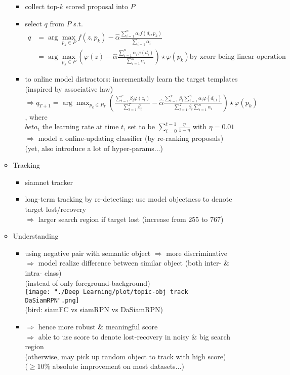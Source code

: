 \begin{itemize}
\begin{itemize}
\begin{itemize}
		\item collect top-$k$ scored proposal into $P$
		\item select $q$ from $P$ s.t. \begin{align*} \displaystyle q &= \arg\max_{p_k\in P} f(z,p_k)-\hat \alpha \frac{\sum_{i=1}^n\alpha_i f(d_i,p_k)}{\sum_{i=1}^n \alpha_i} \\ &= \arg\max_{p_k\in P} (\varphi(z) - \hat\alpha \frac{\sum_{i=1}^n\alpha_i \varphi(d_i)}{\sum_{i=1}^n\alpha_i}) \star \varphi(p_k) \text{by xcorr being linear operation} \end{align*}
		\item to online model distractors: incrementally learn the target templates \\ (inspired by associative law) \\
		$\Rightarrow \displaystyle q_{T+1} = \arg\max_{p_k\in P_T} (\frac{\sum_{t=1}^T\beta_t\varphi(z_t)}{\sum_{t=1}^T\beta_t} - \hat\alpha \frac{\sum_{t=1}^T\beta_t \sum_{i=1}^n\alpha_i \varphi(d_{i,t})}{\sum_{t=1}^T\beta_t\sum_{i=1}^n\alpha_i}) \star \varphi(p_k)$, where \\
		$beta_t$ the learning rate at time $t$, set to be $\sum_{i=0}^{t-1}\frac{\eta}{1-\eta}$ with $\eta=0.01$ \\
		$\Rightarrow$ model a online-updating classifier (by re-ranking proposals) \\
		(yet, also introduce a lot of hyper-params...)
		\end{itemize}
	\item Tracking
		\begin{itemize}
		\item siamnet tracker
		\item long-term tracking by re-detecting: use model objectness to denote target lost/recovery \\
		$\Rightarrow$ larger search region if target lost (increase from $255$ to $767$)
		\end{itemize}
	\item Understanding
		\begin{itemize}
		\item using negative pair with semantic object $\Rightarrow$ more discriminative \\
		$\Rightarrow$ model realize difference between similar object (both inter- \& intra- class) \\
		(instead of only foreground-background) \\
		\texttt{[image: "./Deep Learning/plot/topic-obj track DaSiamRPN".png]} \\
		(bird: siamFC vs siamRPN vs DaSiamRPN)
		\item $\Rightarrow$ hence more robust \& meaningful score \\ 
		$\Rightarrow$ able to use score to denote lost-recovery in noisy \& big search region \\
		(otherwise, may pick up random object to track with high score) \\
		($\ge 10\%$ absolute improvement on most datasets...)
		\end{itemize}
	\end{itemize}


\end{itemize}
